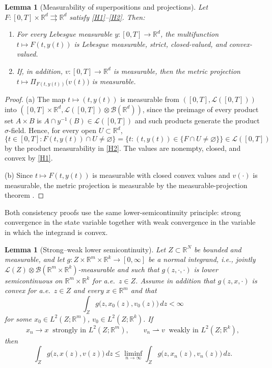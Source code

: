 \documentclass[11pt]{elsarticle}
\newtheorem{lemma}[theorem]{Lemma}
\theoremstyle{definition}
\theoremstyle{remark}
\numberwithin{equation}{section}
\begin{document}
	\begin{lemma}[Measurability of superpositions and projections]
		\label{lem:superposition-measurable}
		Let $F:[0,T]\times\mathbb{R}^d\rightrightarrows\mathbb{R}^d$ satisfy
		{\rm \ref{H1}--\ref{H2}}. Then:
		\begin{enumerate}
			\item[\rm(a)] For every Lebesgue measurable
			$y:[0,T]\to\mathbb{R}^d$, the multifunction
			$t\mapsto F(t,y(t))$ is Lebesgue measurable, strict, closed-valued, and convex-valued.
			\item[\rm(b)] If, in addition, $v:[0,T]\to\mathbb{R}^d$ is measurable,
			then the metric projection
			$t\mapsto \Pi_{F(t,y(t))}\bigl(v(t)\bigr)$ is measurable.
		\end{enumerate}
	\end{lemma}
	
	\begin{proof}
		(a) The map $t\mapsto(t,y(t))$ is measurable from
		$([0,T],\mathscr{L}([0,T]))$ into
		$([0,T]\times\mathbb{R}^d,
		\mathscr{L}([0,T])\otimes\mathcal{B}(\mathbb{R}^d))$, since the
		preimage of every product set $A\times B$ is
		$A\cap y^{-1}(B)\in\mathscr{L}([0,T])$ and such products generate
		the product $\sigma$-field. Hence, for every open
		$U\subset\mathbb{R}^d$,
		\[
		\bigl\{t\in[0,T]:F(t,y(t))\cap U\neq\varnothing\bigr\}
		=
		\bigl\{t:(t,y(t))\in
		\{F\cap U\neq\varnothing\}\bigr\}
		\in\mathscr{L}([0,T])
		\]
		by the product measurability in \ref{H2}. The values are
		nonempty, closed, and convex by \ref{H1}.
		
		(b) Since $t\mapsto F(t,y(t))$ is measurable with closed convex
		values and $v(\cdot)$ is measurable, the metric projection is
		measurable by the measurable-projection theorem
		\cite[Theorem~8.2.11]{aubin_frankowska_2009}.
	\end{proof}
	
	Both consistency proofs use the same lower-semicontinuity principle:
	strong convergence in the state variable together with weak convergence
	in the variable in which the integrand is convex.
	
	\begin{lemma}[Strong--weak lower semicontinuity]
		\label{lem:strong-weak-lsc}
		Let $Z\subset\mathbb{R}^N$ be bounded and measurable, and let
		$g:Z\times\mathbb{R}^m\times\mathbb{R}^k\to[0,\infty]$ be a normal
		integrand, i.e., jointly
		$\mathscr{L}(Z)\otimes
		\mathcal{B}(\mathbb{R}^m\times\mathbb{R}^k)$-measurable
		and such that $g(z,\cdot,\cdot)$ is lower semicontinuous on
		$\mathbb{R}^m\times\mathbb{R}^k$ for a.e.\ $z\in Z$. Assume in
		addition that $g(z,x,\cdot)$ is convex for a.e.\ $z\in Z$ and every
		$x\in\mathbb{R}^m$ and that 
		\[
		\int_Z g\bigl(z,x_0(z),v_0(z)\bigr)\,dz < \infty
		\]
		for some $x_0\in L^2(Z;\mathbb{R}^m)$, $v_0\in L^2(Z;\mathbb{R}^k)$. If
		\[
		x_n\to x \ \text{ strongly in } L^2(Z;\mathbb{R}^m),
		\qquad
		v_n\rightharpoonup v \ \text{ weakly in } L^2(Z;\mathbb{R}^k),
		\]
		then
		\[
		\int_Z g\bigl(z,x(z),v(z)\bigr)\,dz
		\le
		\liminf_{n\to\infty}\int_Z g\bigl(z,x_n(z),v_n(z)\bigr)\,dz.
		\]
	\end{lemma}
	
\end{document}
